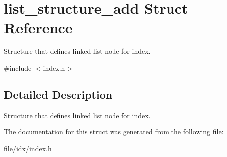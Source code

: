 \hypertarget{structlist__structure__add}{\section{list\+\_\+structure\+\_\+add Struct Reference}
\label{structlist__structure__add}
}


Structure that defines linked list node for index.  




{\ttfamily \#include $<$index.\+h$>$}



\subsection{Detailed Description}
Structure that defines linked list node for index. 

The documentation for this struct was generated from the following file\+:\begin{DoxyCompactItemize}
\item 
file/idx/\hyperlink{index_8h}{index.\+h}\end{DoxyCompactItemize}
